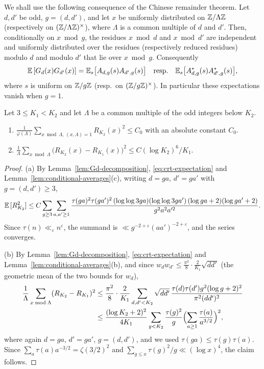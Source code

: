 We shall use the following consequence of the Chinese remainder theorem. Let $d,d'$ be odd, $g=(d,d')$, and let $x$ be uniformly distributed on $\mathbb{Z}/\Lambda\mathbb{Z}$ (respectively on $(\mathbb{Z}/\Lambda\mathbb{Z})^\times$), where $\Lambda$ is a common multiple of $d$ and $d'$. Then, conditionally on $x\bmod g$, the residues $x\bmod d$ and $x\bmod d'$ are independent and uniformly distributed over the residues (respectively reduced residues) modulo $d$ and modulo $d'$ that lie over $x\bmod g$. Consequently
\begin{equation}\label{eq:crt-expectation}
\mathbb{E}\,[G_d(x)G_{d'}(x)]=\mathbb{E}_s\bigl[A_{d,g}(s)A_{d',g}(s)\bigr]\quad\text{resp.}\quad\mathbb{E}_s\bigl[A^*_{d,g}(s)A^*_{d',g}(s)\bigr],
\end{equation}
where $s$ is uniform on $\mathbb{Z}/g\mathbb{Z}$ (resp.\ on $(\mathbb{Z}/g\mathbb{Z})^\times$). In particular these expectations vanish when $g=1$.

\begin{lemma}\label{lem:mean-squares}
Let $3\le K_1<K_2$ and let $\Lambda$ be a common multiple of the odd integers below $K_2$.
\begin{enumerate}[label=\textup{(\alph*)},leftmargin=*]
\item $\frac{1}{\varphi(\Lambda)}\sum_{x\bmod \Lambda,\,(x,\Lambda)=1}R_{K_2}(x)^2\le C_0$ with an absolute constant $C_0$.
\item $\frac1\Lambda \sum_{x\bmod \Lambda}\bigl(R_{K_2}(x)-R_{K_1}(x)\bigr)^2\le C(\log K_2)^6/K_1$.
\end{enumerate}
\end{lemma}

\begin{proof}
(a) By Lemma~\ref{lem:Gd-decomposition}, \eqref{eq:crt-expectation} and Lemma~\ref{lem:conditional-averages}(c), writing $d=ga$, $d'=ga'$ with $g=(d,d')\ge 3$,
\[
\mathbb{E}\,[R_{K_2}^2]\le C\sum_{g\ge 3}\sum_{a,a'\ge 1}\frac{\tau(ga)^2\tau(ga')^2\,(\log\log 3ga)(\log\log 3ga')\,(\log ga+2)(\log ga'+2)}{g^2a^2a'^2}.
\]
Since $\tau(n)\ll_\varepsilon n^\varepsilon$, the summand is $\ll g^{-2+\varepsilon}(aa')^{-2+\varepsilon}$, and the series converges.

(b) By Lemma~\ref{lem:Gd-decomposition}, \eqref{eq:crt-expectation} and Lemma~\ref{lem:conditional-averages}(b), and since $w_dw_{d'}\le\frac{\pi^2}{8}\cdot\frac{2}{K_1}\sqrt{dd'}$ (the geometric mean of the two bounds for $w_d$),
\begin{align*}
\frac1\Lambda \sum_{x\bmod \Lambda}(R_{K_2}-R_{K_1})^2&\le\frac{\pi^2}{8}\cdot\frac{2}{K_1}\sum_{d,d'<K_2}\sqrt{dd'}\,\frac{\tau(d)\tau(d')g^2(\log g+2)^2}{\pi^2(dd')^2}\\
&\le\frac{(\log K_2+2)^2}{4K_1}\sum_{g<K_2}\frac{\tau(g)^2}{g}\Bigl(\sum_{a\ge 1}\frac{\tau(a)}{a^{3/2}}\Bigr)^2,
\end{align*}
where again $d=ga$, $d'=ga'$, $g=(d,d')$, and we used $\tau(ga)\le\tau(g)\tau(a)$. Since $\sum_a\tau(a)a^{-3/2}=\zeta(3/2)^2$ and $\sum_{g\le x}\tau(g)^2/g\ll(\log x)^4$, the claim follows.
\end{proof}


